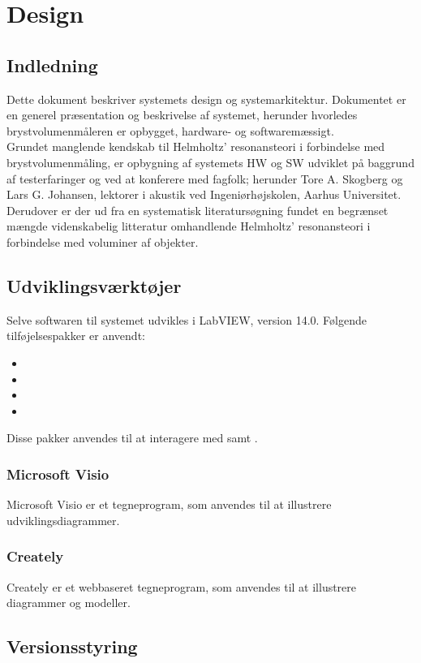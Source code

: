 
\chapter{Design}
\section{Indledning}
Dette dokument beskriver systemets design og systemarkitektur. Dokumentet er en generel præsentation og beskrivelse af systemet, herunder hvorledes brystvolumenmåleren er opbygget, hardware-  og softwaremæssigt. \\
Grundet manglende kendskab til Helmholtz' resonansteori i forbindelse med brystvolumenmåling, er opbygning af systemets HW og SW udviklet på baggrund af testerfaringer og ved at konferere med fagfolk; herunder Tore A. Skogberg og Lars G. Johansen, lektorer i akustik ved Ingeniørhøjskolen, Aarhus Universitet. Derudover er der ud fra en systematisk literatursøgning fundet en begrænset mængde videnskabelig litteratur omhandlende Helmholtz' resonansteori i forbindelse med voluminer af objekter.

\section{Udviklingsværktøjer}
Selve softwaren til systemet udvikles i LabVIEW, version 14.0. Følgende tilføjelsespakker er anvendt:
\begin{itemize}
\item \visa
\item \vi
\item \ardsw	
\item \daqsoft 
\end{itemize}

Disse pakker anvendes til at interagere med \arduino{} samt \daq. 

	\subsection{Microsoft Visio}   
	Microsoft Visio er et tegneprogram, som anvendes til at illustrere udviklingsdiagrammer. 
		
	\subsection{Creately}
	Creately er et webbaseret tegneprogram, som anvendes til at illustrere diagrammer og modeller.  
	
\section{Versionsstyring}
